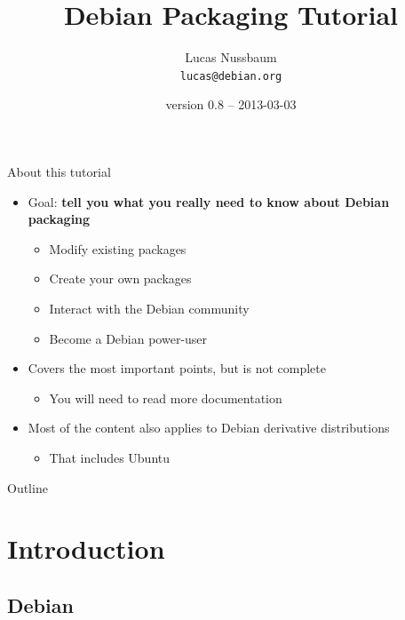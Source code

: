 \documentclass[10pt,final]{beamer}
\title{Debian Packaging Tutorial}
\author[]{Lucas Nussbaum\\{\small\texttt{lucas@debian.org}}}
\date{\footnotesize version 0.8 -- 2013-03-03} %
\begin{document}
\frame{\titlepage}

\begin{frame}{About this tutorial}
  \begin{itemize}
  \item Goal: \textbf{tell you what you really need to know about Debian packaging}
    \begin{itemize}
      \hbr
    \item Modify existing packages
      \hbr
    \item Create your own packages
	    \hbr
    \item Interact with the Debian community
      \hbr
    \item Become a Debian power-user
    \end{itemize}
    \br
  \item Covers the most important points, but is not complete
    \begin{itemize}
    \item You will need to read more documentation
    \end{itemize}
    \br
  \item Most of the content also applies to Debian derivative distributions
    \begin{itemize}
      \hbr
    \item That includes Ubuntu
    \end{itemize}
  \end{itemize}
\end{frame}

\begin{frame}{Outline}
  \tableofcontents[hideallsubsections]
\end{frame}

\section{Introduction}

\subsection{Debian}
\end{document}
